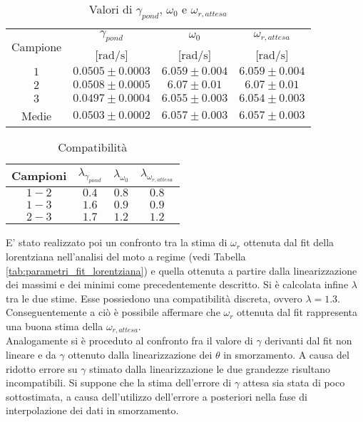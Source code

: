 \documentclass[a4paper,11pt,oneside]{article}
\begin{document}
\begin{table}[h!]
    \centering
    \begin{tabular}{|c|c|c|c|}
        \hline
        \multirow{2}{*}{Campione} & $\gamma_{pond}$ & $\omega_0$ & $\omega_{r,attesa}$ \\
        & [$\si{\radian\per\second}$] & [$\si{\radian\per\second}$] & [$\si{\radian\per\second}$]\\ \hline
        \rowcolor[rgb]{0.85,0.85,0.85}$1$ & $0.0505\pm0.0003$ & $6.059\pm0.004$ & $6.059\pm0.004$ \\ \hline
        $2$ & $0.0508\pm0.0005$ & $6.07\pm0.01$ & $6.07\pm0.01$ \\ \hline
        \rowcolor[rgb]{0.85,0.85,0.85}$3$ & $0.0497\pm0.0004$ & $6.055\pm0.003$ & $6.054\pm0.003$ \\ \hline \hline
        Medie & $0.0503\pm0.0002$ & $6.057\pm0.003$ & $6.057\pm0.003$ \\ \hline
    \end{tabular}
    \caption{Valori di $\gamma_{pond}$, $\omega_0$ e $\omega_{r,attesa}$}
    \label{tab:valori_gamma_omega}
\end{table}



\begin{table}[h!]
    \centering
    \begin{tabular}{|c|c|c|c|}
    \hline
        Campioni & $\lambda_{\gamma_{pond}}$ & $\lambda_{\omega_0}$ & $\lambda_{\omega_{r,attesa}}$\\ \hline
        \rowcolor[rgb]{0.85,0.85,0.85}$1-2$ & $0.4$ & $0.8$ & $0.8$ \\ \hline
        $1-3$ & $1.6$ & $0.9$ & $0.9$ \\ \hline
        \rowcolor[rgb]{0.85,0.85,0.85}$2-3$ & $1.7$ & $1.2$ & $1.2$ \\ \hline
    \end{tabular}
    \caption{Compatibilità}
    \label{tab:comp_gamma_omega}
\end{table}



E' stato realizzato poi un confronto tra la stima di $\omega_{r}$ ottenuta dal fit della lorentziana nell'analisi del moto a regime (vedi Tabella \ref{tab:parametri_fit_lorentziana}) e quella ottenuta a partire dalla linearizzazione dei massimi e dei minimi come precedentemente descritto.
Si è calcolata infine $\lambda$ tra le due stime. Esse possiedono una compatibilità discreta, ovvero  $\lambda = 1.3$. Conseguentemente a ciò è possibile affermare che $\omega_r$ ottenuta dal fit rappresenta una buona stima della $\omega_{r,attesa}$.\\
Analogamente si è proceduto al confronto fra il valore di $\gamma$ derivanti dal fit non lineare e da $\gamma$ ottenuto dalla linearizzazione dei $\theta$ in smorzamento. A causa del ridotto errore su $\gamma$ stimato dalla linearizzazione le due grandezze risultano incompatibili. Si suppone che la stima dell'errore di $\gamma$ attesa sia stata di poco sottostimata, a causa dell'utilizzo dell'errore a posteriori nella fase di interpolazione dei dati in smorzamento.
\end{document}
